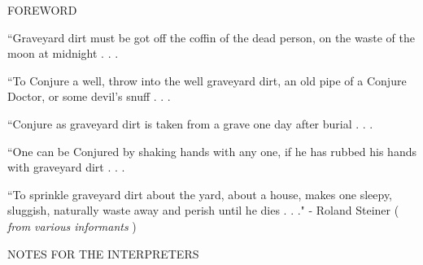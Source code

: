 \documentclass[12pt]{article}
\begin{document}
\begin{center}
\huge FOREWORD
\end{center}

\vspace*{1\baselineskip}

\begingroup
\begin{center}
``Graveyard dirt must be got off the coffin of the dead person, on the waste of the moon at midnight . . . 
\end{center}
\endgroup

\begingroup
\begin{center}
``To Conjure a well, throw into the well graveyard dirt, an old pipe of a Conjure Doctor, or some devil's snuff . . . 
\end{center}
\endgroup

\begingroup
\begin{center}
``Conjure as graveyard dirt is taken from a grave one day after burial . . . 
\end{center}
\endgroup

\begingroup
\begin{center}
``One can be Conjured by shaking hands with any one, if he has rubbed his hands with graveyard dirt . . . 
\end{center}
\endgroup

\begingroup
\begin{center}
``To sprinkle graveyard dirt about the yard, about a house, makes one sleepy, sluggish, naturally waste away and perish until he dies . . ." 
\rightskip\leftskip
\phantom{text} \hfill - Roland Steiner ( \textit{from various informants} )
\end{center}
\endgroup

\vspace*{1\baselineskip}

\begin{center}
\huge NOTES FOR THE INTERPRETERS
\end{center}

\vspace*{1\baselineskip}
\end{document}
